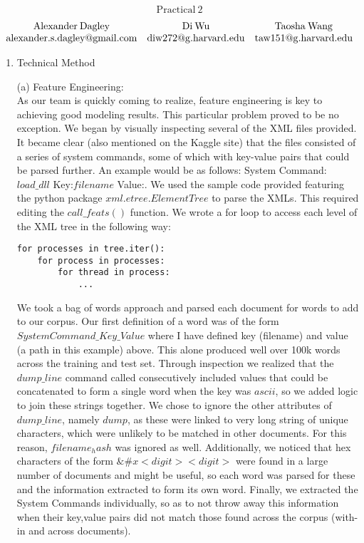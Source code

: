 \documentclass[12pt]{article}
\newcommand\tab[1][0.5cm]{\hspace*{#1}}
\begin{document}
\begin{align*}
\mathrm{Practical \:2}
\end{align*}
$$
\begin{array}{c  c  c}
\mathrm{Alexander \: Dagley} & \mathrm{Di \: Wu} &\mathrm{Taosha \:Wang} \\
\mathrm{alexander.s.dagley@gmail.com} & \mathrm{diw272@g.harvard.edu}&\mathrm{taw151@g.harvard.edu}\\
\end{array}
$$

\begin{enumerate}
\item
Technical Method
\item[(a)]
Feature Engineering:\\

\tab As our team is quickly coming to realize, feature engineering is key to achieving good modeling results.  This particular problem proved to be no exception.  We began by visually inspecting several of the XML files provided.  It became clear (also mentioned on the Kaggle site) that the files consisted of a series of system commands, some of which with key-value pairs that could be parsed further.  An example would be as follows: System Command:$load\_dll$ Key:$filename$  Value:.  We used the sample code provided featuring the python package $xml.etree.ElementTree$ to parse the XMLs.  This required editing the $call\_feats()$ function. We wrote a for loop to access each level of the XML tree in the following way: 

\begin{lstlisting}
for processes in tree.iter():
	for process in processes:
		for thread in process:
			...
\end{lstlisting}

\tab We took a bag of words approach and parsed each document for words to add to our corpus.  Our first definition of a word was of the form $SystemCommand\_Key\_Value$ where I have defined key (filename) and value (a path in this example) above.  This alone produced well over 100k words across the training and test set. Through inspection we realized that the $dump\_line$ command called consecutively included values that could be concatenated to form a single word when the key was $ascii$, so we added logic to join these strings together. We chose to ignore the other attributes of $dump\_line$, namely $dump$, as these were linked to very long string of unique characters, which were unlikely to be matched in other documents.  For this reason, $filename_hash$ was ignored as well.  Additionally, we noticed that hex characters of the form $\&\#x<digit><digit>$ were found in a large number of documents and might be useful, so each word was parsed for these and the information extracted to form its own word.  Finally, we extracted the System Commands individually, so as to not throw away this information when their key,value pairs did not match those found across the corpus (with-in and across documents).


\end{enumerate}
\end{document}

